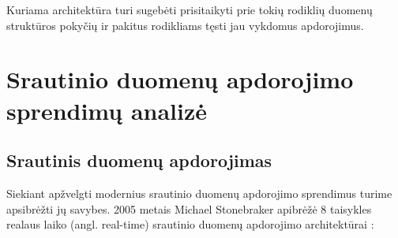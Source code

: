 \documentclass{VUMIFPSbakalaurinis}
\begin{document}
Kuriama architektūra turi sugebėti prisitaikyti prie tokių rodiklių duomenų struktūros pokyčių ir pakitus rodikliams tęsti jau vykdomus apdorojimus. 

\section{Srautinio duomenų apdorojimo sprendimų analizė}

\subsection{Srautinis duomenų apdorojimas} \label{strprocess}

Siekiant apžvelgti modernius srautinio duomenų apdorojimo sprendimus turime apsibrėžti jų savybes.
2005 metais Michael Stonebraker apibrėžė 8 taisykles realaus laiko (angl. real-time) srautinio duomenų apdorojimo architektūrai \cite{stonebraker20058}:
\end{document}
